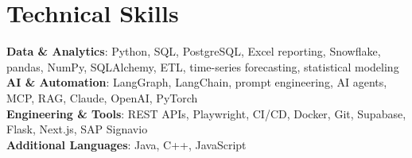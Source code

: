 \documentclass[letterpaper,11pt]{article}
\begin{document}
\section{Technical Skills}
 \begin{itemize}[leftmargin=0.15in, label={}, topsep=2pt]
    \small{\item{
     \textbf{Data \& Analytics}{: Python, SQL, PostgreSQL, Excel reporting, Snowflake, pandas, NumPy, SQLAlchemy, ETL, time-series forecasting, statistical modeling} \\
     \textbf{AI \& Automation}{: LangGraph, LangChain, prompt engineering, AI agents, MCP, RAG, Claude, OpenAI, PyTorch} \\
     \textbf{Engineering \& Tools}{: REST APIs, Playwright, CI/CD, Docker, Git, Supabase, Flask, Next.js, SAP Signavio} \\
     \textbf{Additional Languages}{: Java, C++, JavaScript}
    }}
 \end{itemize}

\end{document}
